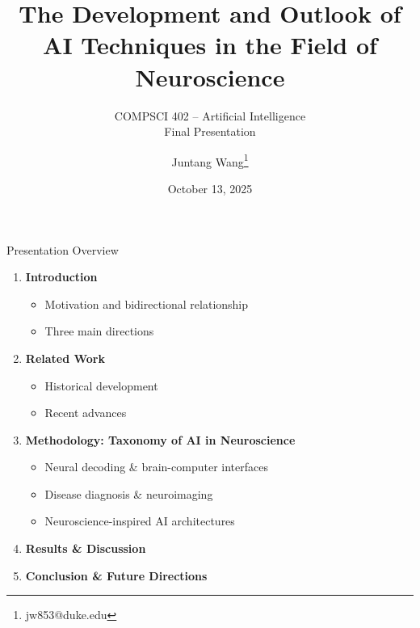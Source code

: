 \documentclass[aspectratio=169]{beamer}
\title[AI in Neuroscience]{The Development and Outlook of AI Techniques in the Field of Neuroscience}
\subtitle{COMPSCI 402 – Artificial Intelligence\\Final Presentation}
\author{Juntang Wang\thanks{jw853@duke.edu}}
\institute{Duke Kunshan University}
\date{October 13, 2025}
\begin{document}
\begin{frame}
  \titlepage
\end{frame}

\begin{frame}{Presentation Overview}
  \begin{enumerate}
    \item \textbf{Introduction}
    \begin{itemize}
      \item Motivation and bidirectional relationship
      \item Three main directions
    \end{itemize}
    
    \item \textbf{Related Work}
    \begin{itemize}
      \item Historical development
      \item Recent advances
    \end{itemize}
    
    \item \textbf{Methodology: Taxonomy of AI in Neuroscience}
    \begin{itemize}
      \item Neural decoding \& brain-computer interfaces
      \item Disease diagnosis \& neuroimaging
      \item Neuroscience-inspired AI architectures
    \end{itemize}
    
    \item \textbf{Results \& Discussion}
    
    \item \textbf{Conclusion \& Future Directions}
  \end{enumerate}
\end{frame}
\end{document}
